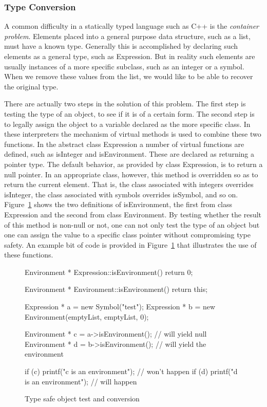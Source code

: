 \subsubsection{Type Conversion}

A common difficulty in a statically typed language such as C++ is the {\em
container problem}.  Elements placed into a general purpose data structure, such
as a list, must have a known type.  Generally this is accomplished by
declaring such elements as a general type, such as {\sf Expression}.  But
in reality such elements are usually instances of a more specific subclass,
such as an integer or a symbol.  When we remove these values from the list,
we would like to be able to recover the original type.

There are actually two steps in the solution of this problem.
The first step is testing the type of an object, to see if it is of a
certain form.   The second step is to legally assign the object to 
a variable declared as the more specific class.  In these interpreters
the mechanism of virtual methods is used to combine these two functions.
In the abstract class {\sf Expression} a number of virtual functions are
defined, such as {\sf isInteger} and {\sf isEnvironment}.   These are
declared as returning a pointer type.   The default behavior, as provided
by class {\sf Expression}, is to return a null pointer.  In an appropriate
class, however, this method is overridden so as to return the current element.
That is, the class associated with integers overrides {\sf isInteger}, the
class associated with symbols overrides {\sf isSymbol}, and so on.
Figure~\ref{isEnvironment} shows the two definitions of {\sf
isEnvironment}, the first from class {\sf Expression} and the second from
class {\sf Environment}.  
By testing whether the result of this method is non-null or not, one can
not only test the type of an object but one can assign the value to
a specific class pointer without compromising type safety.
An example bit of code is provided in Figure~\ref{isEnvironment} that
illustrates the use of these functions.

\begin{figure}
\begin{cprog}
Environment * Expression::isEnvironment() 
{ 
	return 0; 
}

Environment * Environment::isEnvironment()
{	
	return this; 
}

Expression * a = new Symbol("test");
Expression * b = new Environment(emptyList, emptyList, 0);

Environment * c = a->isEnvironment();	// will yield null
Environment * d = b->isEnvironment();	// will yield the environment

if (c) 
	printf("c is an environment");	// won't happen
if (d)
	printf("d is an environment");	// will happen
\end{cprog}
\caption{Type safe object test and conversion}\label{isEnvironment}
\end{figure}

